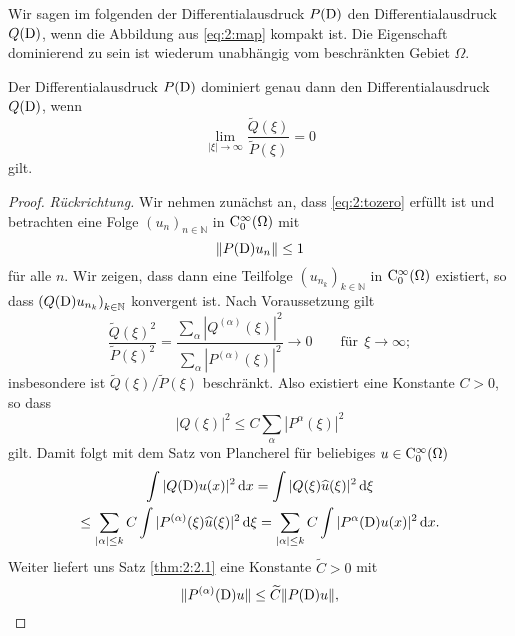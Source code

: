 Wir sagen im folgenden der Differentialausdruck $P(\mathrm D)$  den Differentialausdruck $Q(\mathrm D)$, wenn die Abbildung aus \eqref{eq:2:map} kompakt ist. Die Eigenschaft dominierend zu sein ist wiederum unabhängig vom beschränkten Gebiet $\Omega$.

\begin{thm}\label{Abbildung kompakt}
Der Differentialausdruck $P(\mathrm D)$ dominiert genau dann den Differentialausdruck $Q(\mathrm D)$,
wenn
\begin{equation}\label{eq:2:tozero}
\lim_{|\xi|\to\infty} \frac{\widetilde{Q}(\xi)}{\widetilde{P}(\xi)} = 0
\end{equation}
gilt.
\end{thm}
\begin{proof} {\it Rückrichtung.}
Wir nehmen zunächst an, dass \eqref{eq:2:tozero} erfüllt ist und betrachten eine Folge ${(u_n)}_{n \in \mathbb{N}} $ in $\mathrm C^\infty_0(\Omega)$ mit
\begin{equation}\label{eq:2:PDb}
\lVert P(\mathrm D)u_n\rVert\leq 1
\end{equation}
für alle $n$. Wir zeigen, dass dann eine Teilfolge ${(u_{n_k})}_{k \in \mathbb{N}}$ in $\mathrm C^\infty_0(\Omega)$ existiert,
so dass  $\left(Q(\mathrm D)u_{n_k}\right)_{k \in \mathbb{N}}$ konvergent ist. Nach Voraussetzung gilt 
\begin{equation}
\frac{\widetilde{Q}(\xi)^2}{\widetilde{P}(\xi)^2} = \frac{\sum_{\alpha} | Q^{(\alpha)} (\xi)|^2  }{ \sum_{\alpha} | P^{(\alpha)} (\xi)|^2} \rightarrow 0\qquad  \text{für} \ \ \xi \rightarrow \infty;
\end{equation}
insbesondere ist $\widetilde Q(\xi)/\widetilde P(\xi)$ beschränkt. Also existiert eine Konstante $C>0$, so dass
\begin{equation}
|Q(\xi)|^2 \leq C \sum_{\alpha} | P^{\alpha} (\xi)|^2 \label{eq:1.5}
\end{equation}
gilt. Damit folgt mit dem Satz von Plancherel für beliebiges $u\in\mathrm C_0^\infty(\Omega)$
\begin{multline}
\int |Q(\mathrm D)u(x)|^2 \,\mathrm d x = \int |Q(\xi) \widehat{u}(\xi)|^2 \,\mathrm d \xi \\
\leq  \sum_{|\alpha| \leq k}C\int | P^{(\alpha)} (\xi) \widehat u(\xi)|^2 \,\mathrm d \xi =\sum_{|\alpha| \leq k} C\int |P^{\alpha}(\mathrm D)u(x)|^2 \,\mathrm d x.
\end{multline}
Weiter liefert uns  Satz \ref{thm:2:2.1} eine Konstante $\widetilde{C}>0$ mit
\begin{equation}
\Vert P^{(\alpha)}(\D)u \Vert \leq \widetilde{C} \Vert P(\D)u \Vert, \label{eq:ableitung leq PD}

\end{equation}
\end{proof}
